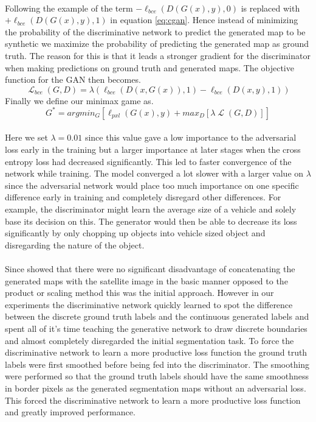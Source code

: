 \documentclass{kththesis}
\DeclareMathOperator{\Lagr}{\mathcal{L}}
\begin{document}
\\
Following the example of \cite{goodfellow_generative_2014, luc_semantic_2016} the term $-\ell_{bce}(D(G(x),y), 0)$  is replaced with  $+\ell_{bce}(D(G(x),y), 1)$ in equation \ref{eq:cgan}. Hence instead of minimizing the probability of the discriminative network to predict the generated map to be synthetic we maximize the probability of predicting the generated map as ground truth. The reason for this is that it leads a stronger gradient for the discriminator when making predictions on ground truth and generated maps. The objective function for the GAN then becomes.
\begin{equation}
\Lagr_{bce}(G, D) =\lambda(\ell_{bce}(D(x,G(x)), 1)-\ell_{bce}(D(x,y), 1))
\end{equation}
Finally we define our minimax game as.
\begin{equation}
G^{*}=argmin_{G}[\ell_{pxl}(G(x),y) + max_{D}[\lambda\Lagr(G, D)] ]
\end{equation}
\\
Here we set $\lambda=0.01$ since this value gave a low importance to the adversarial loss early in the training but a larger importance at later stages when the cross entropy loss had decreased significantly. This led to faster convergence of the network while training. The model converged a lot slower with a larger value on $\lambda$ since the adversarial network would place too much importance on one specific difference early in training and completely disregard other differences. For example, the discriminator might learn the average size of a vehicle and solely base its decision on this. The generator would then be able to decrease its loss significantly by only chopping up objects into vehicle sized object and disregarding the nature of the object.\\
\\
Since \cite{luc_semantic_2016} showed that there were no significant disadvantage of concatenating the generated maps with the satellite image in the basic manner opposed to the product or scaling method this was the initial approach. However in our experiments the discriminative network quickly learned to spot the difference between the discrete ground truth labels and the continuous generated labels and spent all of it's time teaching the generative network to draw discrete boundaries and almost completely disregarded the initial segmentation task. To force the discriminative network to learn a more productive loss function the ground truth labels were first smoothed before being fed into the discriminator. The smoothing were performed so that the ground truth labels should have the same smoothness in border pixels as the generated segmentation maps without an adversarial loss. This forced the discriminative network to learn a more productive loss function and greatly improved performance.\\
\end{document}
